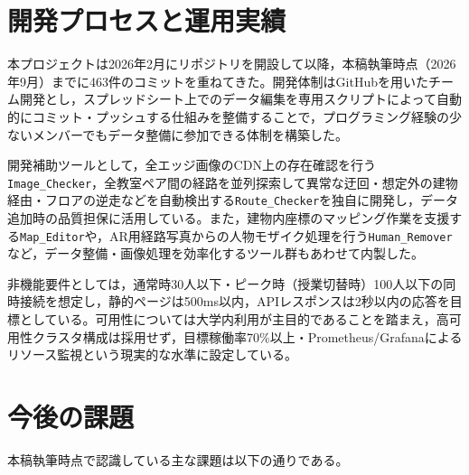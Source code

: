 \documentclass[a4paper,10.5pt]{ltjsarticle}
\begin{document}
\section{開発プロセスと運用実績}
\label{sec:process}

本プロジェクトは2026年2月にリポジトリを開設して以降，本稿執筆時点（2026年9月）までに463件のコミットを重ねてきた。開発体制はGitHubを用いたチーム開発とし，スプレッドシート上でのデータ編集を専用スクリプトによって自動的にコミット・プッシュする仕組みを整備することで，プログラミング経験の少ないメンバーでもデータ整備に参加できる体制を構築した。

開発補助ツールとして，全エッジ画像のCDN上の存在確認を行う\texttt{Image\_Checker}，全教室ペア間の経路を並列探索して異常な迂回・想定外の建物経由・フロアの逆走などを自動検出する\texttt{Route\_Checker}を独自に開発し，データ追加時の品質担保に活用している。また，建物内座標のマッピング作業を支援する\texttt{Map\_Editor}や，AR用経路写真からの人物モザイク処理を行う\texttt{Human\_Remover}など，データ整備・画像処理を効率化するツール群もあわせて内製した。

非機能要件としては，通常時30人以下・ピーク時（授業切替時）100人以下の同時接続を想定し，静的ページは500ms以内，APIレスポンスは2秒以内の応答を目標としている。可用性については大学内利用が主目的であることを踏まえ，高可用性クラスタ構成は採用せず，目標稼働率70\%以上・Prometheus/Grafanaによるリソース監視という現実的な水準に設定している。

\section{今後の課題}
\label{sec:future}

本稿執筆時点で認識している主な課題は以下の通りである。
\end{document}

